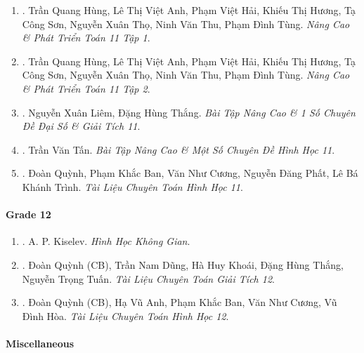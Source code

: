 \documentclass{article}
\begin{document}
\begin{enumerate}
	\item \cite{Hung_nang_cao_phat_trien_Toan_11_tap_1}. Trần Quang Hùng, Lê Thị Việt Anh, Phạm Việt Hải, Khiếu Thị Hương, Tạ Công Sơn, Nguyễn Xuân Thọ, Ninh Văn Thu, Phạm Đình Tùng. {\it Nâng Cao \& Phát Triển Toán 11 Tập 1}.\hfill{\sf[reading]}
	
	\item \cite{Hung_nang_cao_phat_trien_Toan_11_tap_2}. Trần Quang Hùng, Lê Thị Việt Anh, Phạm Việt Hải, Khiếu Thị Hương, Tạ Công Sơn, Nguyễn Xuân Thọ, Ninh Văn Thu, Phạm Đình Tùng. {\it Nâng Cao \& Phát Triển Toán 11 Tập 2}.\hfill{\sf[reading]}
	
	\item \cite{Liem_Thang2020}. Nguyễn Xuân Liêm, Đặng Hùng Thắng. {\it Bài Tập Nâng Cao \& 1 Số Chuyên Đề Đại Số \& Giải Tích 11}.\hfill{\sf[reading]}
	
	\item \cite{Tan2017}. Trần Văn Tấn. {\it Bài Tập Nâng Cao \& Một Số Chuyên Đề Hình Học 11}.\hfill{\sf[reading]}
	
	\item \cite{TLCT_hinh_hoc_11}. Đoàn Quỳnh, Phạm Khắc Ban, Văn Như Cương, Nguyễn Đăng Phất, Lê Bá Khánh Trình. {\it Tài Liệu Chuyên Toán Hình Học 11}.\hfill{\sf[reading]}	
\end{enumerate}

\paragraph{Grade 12}

\begin{enumerate}
	\item \cite{Kiselev_hhkg}. A. P. Kiselev. {\it Hình Học Không Gian}.\hfill{\sf[reading]}
	
	\item \cite{TLCT_giai_tich_12}. Đoàn Quỳnh (CB), Trần Nam Dũng, Hà Huy Khoái, Đặng Hùng Thắng, Nguyễn Trọng Tuấn. {\it Tài Liệu Chuyên Toán Giải Tích 12}.\hfill{\sf[reading]}
	
	\item \cite{TLCT_hinh_hoc_12}. Đoàn Quỳnh (CB), Hạ Vũ Anh, Phạm Khắc Ban, Văn Như Cương, Vũ Đình Hòa. {\it Tài Liệu Chuyên Toán Hình Học 12}.\hfill{\sf[reading]}
\end{enumerate}

\paragraph{Miscellaneous}
\end{document}
